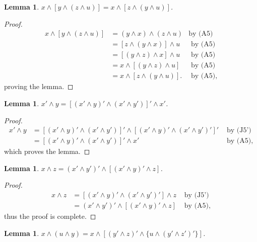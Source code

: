\documentclass{amsart}
\theoremstyle{plain}
\newtheorem{lemma}[theorem]{Lemma}
\theoremstyle{problem}
\theoremstyle{definition}
\theoremstyle{remark}
\numberwithin{equation}{section}
\begin{document}
\begin{lemma} \label{62} %
    $x \land [y \land (z \land u)] = x \land [z \land (y \land u)]$.
\end{lemma}
\begin{proof}
\begin{align*}
    x \land [y \land (z \land u)] &= (y \land x) \land (z \land u)  &\text{by (A5)}\\
                                  &= [z \land (y \land x)] \land u  &\text{ by (A5)}\\
                                  &= [(y \land z) \land x] \land u &\text{ by (A5)}\\
                                  &= x \land [(y \land z) \land u] &\text{ by (A5)}\\
                                  &=x \land [z \land (y \land u)]. &\text{ by (A5)},
\end{align*}
proving the lemma.
\end{proof}

\begin{lemma} \label{63} %
    $ x' \land y = [(x' \land y)' \land (x' \land y')]' \land x'  $.
\end{lemma}
\begin{proof}
\begin{align*}
    x' \land y 
        &= [(x' \land y)' \land (x' \land y')]' \land [(x' \land y)' \land (x' \land y')']' &\text{ by (J5')}\\
        &= [(x' \land y)' \land (x' \land y')]' \land x'  &\text{ by (A5)},
\end{align*}
which proves the lemma.
\end{proof}

\begin{lemma} \label{64} %
    $x \land z  = (x' \land y')' \land [(x' \land y)' \land z] $.
\end{lemma}
\begin{proof}
\begin{align*}
    x \land z &= [(x' \land y)' \land (x' \land y')'] \land z &\text{ by (J5')}\\
              &= (x' \land y')' \land [(x' \land y)' \land z]   &\text{ by (A5)},
\end{align*}
thus the proof is complete.
\end{proof}

\begin{lemma} \label{65} %
    $x \land (u \land y) =  x \land [(y' \land z)' \land \{u \land (y' \land z')' \}]$.
\end{lemma}
\end{document}
